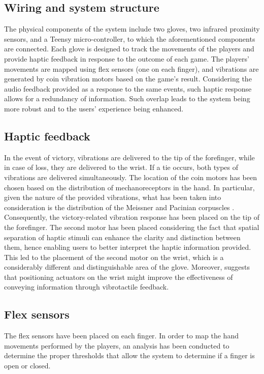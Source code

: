 \documentclass[11pt,a4paper]{report}
\begin{document}
\subsection*{Wiring and system structure}

The physical components of the system include two gloves, two infrared proximity sensors, and a Teensy micro-controller, to which the aforementioned components are connected. Each glove is designed to track the movements of the players and provide haptic feedback in response to the outcome of each game. The players' movements are mapped using flex sensors (one on each finger), and vibrations are generated by coin vibration motors based on the game's result.
Considering the audio feedback provided as a response to the same events, such haptic response allows for a redundancy of information. Such overlap leads to the system being more robust and to the users' experience being enhanced.

\subsection*{Haptic feedback}
In the event of victory, vibrations are delivered to the tip of the forefinger, while in case of loss, they are delivered to the wrist. 
If a tie occurs, both types of vibrations are delivered simultaneously.
The location of the coin motors has been chosen based on the distribution of mechanoreceptors in the hand. In particular, given the nature of the provided vibrations, what has been taken into consideration is the distribution of the Meissner and Pacinian corpuscles \cite*{6}. 
Consequently, the victory-related vibration response has been placed on the tip of the forefinger. The second motor has been placed considering the fact that spatial separation of haptic stimuli can enhance the clarity and distinction between them, hence enabling users to better interpret the haptic information provided. This led to the placement of the second motor on the wrist, which is a considerably different and distinguishable area of the glove. 
Moreover, \cite*{7} suggests that positioning actuators on the wrist might improve the effectiveness of conveying information through vibrotactile feedback. 

\subsection*{Flex sensors}
The flex sensors have been placed on each finger. In order to map the hand movements performed by the players, an analysis has been conducted to determine the proper thresholds that allow the system to determine if a finger is open or closed.
\end{document}
